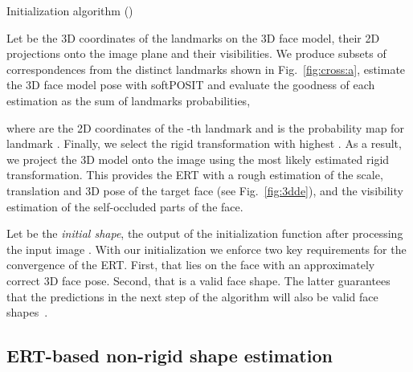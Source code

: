 \documentclass[11pt,twocolumn]{article}
\begin{document}
\begin{algorithm}
\footnotesize
\caption{Initialization algorithm ()}
\label{alg:initial}
\end{algorithm}

Let  be the 3D coordinates of the  landmarks on the 3D face model,  their 2D projections onto the image plane and  their visibilities. 
We produce subsets of correspondences  from the distinct landmarks shown in Fig.~\ref{fig:cross:a}, estimate the 3D face model pose  with softPOSIT and evaluate the goodness of each estimation as the sum of landmarks probabilities, 

where  are the 2D coordinates of the -th landmark and  is the probability map for landmark . Finally, we select the rigid transformation  with highest . As a result, we project the 3D model onto the image using the most likely estimated rigid transformation. This provides the ERT with a rough estimation of the scale, translation and 3D pose of the target face (see Fig.~\ref{fig:3dde}), and the visibility estimation of the self-occluded parts of the face.

Let  be the \emph{initial shape}, the output of the initialization function  after processing the input image . With our initialization we enforce two key requirements for the convergence of the ERT. First, that  lies on the face with an approximately correct 3D face pose. Second, that  is a valid face shape. The latter guarantees that the predictions in the next step of the algorithm will also be valid face shapes~\citep{Cao14}.

\subsection{ERT-based non-rigid shape estimation}
\label{sec:non_rigid}
\end{document}
